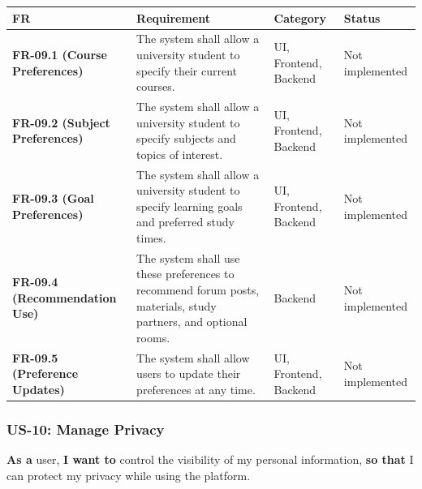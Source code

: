 \documentclass[12pt]{article}
\renewcommand{\baselinestretch}{1.5}
\begin{document}
\begingroup
\small
\renewcommand{\baselinestretch}{1.0}\selectfont
\renewcommand{\arraystretch}{1.15}
\setlength{\tabcolsep}{6pt}
\begin{longtable}{|>{\raggedright\arraybackslash}p{}|>{\raggedright\arraybackslash}p{}|>{\raggedright\arraybackslash}p{}|>{\raggedright\arraybackslash}p{}|}
\hline
\textbf{FR} & \textbf{Requirement} & \textbf{Category} & \textbf{Status} \\ \hline
\endhead
\textbf{FR-09.1 (Course Preferences)} & The system shall allow a university student to specify their current courses. & UI, Frontend, Backend & Not implemented \\ \hline
\textbf{FR-09.2 (Subject Preferences)} & The system shall allow a university student to specify subjects and topics of interest. & UI, Frontend, Backend & Not implemented \\ \hline
\textbf{FR-09.3 (Goal Preferences)} & The system shall allow a university student to specify learning goals and preferred study times. & UI, Frontend, Backend & Not implemented \\ \hline
\textbf{FR-09.4 (Recommendation Use)} & The system shall use these preferences to recommend forum posts, materials, study partners, and optional rooms. & Backend & Not implemented \\ \hline
\textbf{FR-09.5 (Preference Updates)} & The system shall allow users to update their preferences at any time. & UI, Frontend, Backend & Not implemented \\ \hline
\end{longtable}
\endgroup
\par\medskip

\hypertarget{sec:us-10-manage-privacy}{}
\subsubsection*{US-10: Manage Privacy}
\par\medskip

\textbf{As a} user, \textbf{I want to} control the visibility of my personal information, \textbf{so that} I can protect my privacy while using the platform.
\par\medskip
\end{document}
